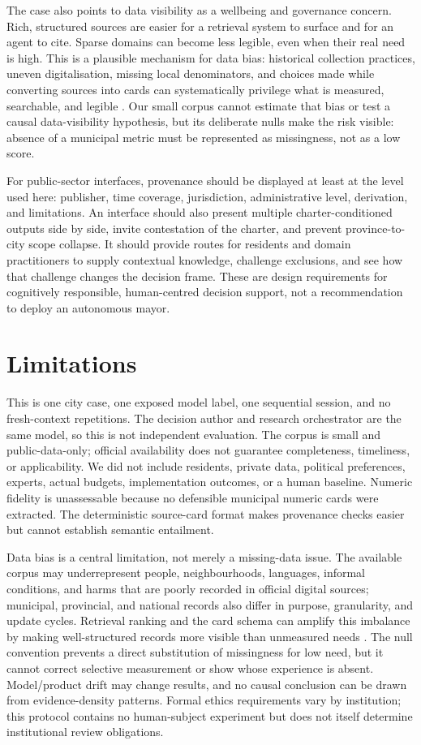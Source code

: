 \documentclass[sigconf,anonymous]{acmart}
\begin{document}
The case also points to data visibility as a wellbeing and governance concern. Rich, structured sources are easier for a retrieval system to surface and for an agent to cite. Sparse domains can become less legible, even when their real need is high. This is a plausible mechanism for data bias: historical collection practices, uneven digitalisation, missing local denominators, and choices made while converting sources into cards can systematically privilege what is measured, searchable, and legible \cite{mehrabi2021survey,suresh2021harm}. Our small corpus cannot estimate that bias or test a causal data-visibility hypothesis, but its deliberate nulls make the risk visible: absence of a municipal metric must be represented as missingness, not as a low score.

For public-sector interfaces, provenance should be displayed at least at the level used here: publisher, time coverage, jurisdiction, administrative level, derivation, and limitations. An interface should also present multiple charter-conditioned outputs side by side, invite contestation of the charter, and prevent province-to-city scope collapse. It should provide routes for residents and domain practitioners to supply contextual knowledge, challenge exclusions, and see how that challenge changes the decision frame. These are design requirements for cognitively responsible, human-centred decision support, not a recommendation to deploy an autonomous mayor.

\section{Limitations}
This is one city case, one exposed model label, one sequential session, and no fresh-context repetitions. The decision author and research orchestrator are the same model, so this is not independent evaluation. The corpus is small and public-data-only; official availability does not guarantee completeness, timeliness, or applicability. We did not include residents, private data, political preferences, experts, actual budgets, implementation outcomes, or a human baseline. Numeric fidelity is unassessable because no defensible municipal numeric cards were extracted. The deterministic source-card format makes provenance checks easier but cannot establish semantic entailment.

Data bias is a central limitation, not merely a missing-data issue. The available corpus may underrepresent people, neighbourhoods, languages, informal conditions, and harms that are poorly recorded in official digital sources; municipal, provincial, and national records also differ in purpose, granularity, and update cycles. Retrieval ranking and the card schema can amplify this imbalance by making well-structured records more visible than unmeasured needs \cite{mehrabi2021survey,suresh2021harm}. The null convention prevents a direct substitution of missingness for low need, but it cannot correct selective measurement or show whose experience is absent. Model/product drift may change results, and no causal conclusion can be drawn from evidence-density patterns. Formal ethics requirements vary by institution; this protocol contains no human-subject experiment but does not itself determine institutional review obligations.
\end{document}
